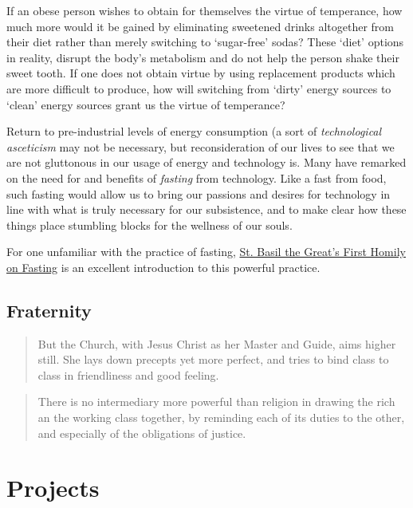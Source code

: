 \documentclass[letterpaper]{article}
\begin{document}
If an obese person wishes to obtain for themselves the virtue of temperance, how much more would it be gained by eliminating sweetened drinks altogether from their diet rather than merely switching to `sugar-free' sodas? These `diet' options in reality, disrupt the body's metabolism and do not help the person shake their sweet tooth. If one does not obtain virtue by using replacement products which are more difficult to produce, how will switching from `dirty' energy sources to `clean' energy sources grant us the virtue of temperance?

Return to pre-industrial levels of energy consumption (a sort of \textit{technological asceticism} may not be necessary, but reconsideration of our lives to see that we are not gluttonous in our usage of energy and technology is. Many have remarked on the need for and benefits of \textit{fasting} from technology. Like a fast from food, such fasting would allow us to bring our passions and desires for technology in line with what is truly necessary for our subsistence, and to make clear how these things place stumbling blocks for the wellness of our souls. 

For one unfamiliar with the practice of fasting, \href{http://rutgersnb.occministries.org/wp-content/uploads/2015/07/St.-Basil-the-Great%E2%80%99s-First-Homily-on-Fasting.pdf}{St. Basil the Great's First Homily on Fasting} is an excellent introduction to this powerful practice. 

\subsection{Fraternity}

\begin{quote}
  But the Church, with Jesus Christ as her Master and Guide, aims higher still. She lays down precepts yet more perfect, and tries to bind class to class in friendliness and good feeling.
\end{quote}

\begin{quote}
  There is no intermediary more powerful than religion in drawing the rich an the working class together, by reminding each of its duties to the other, and especially of the obligations of justice.
\end{quote}

\section{Projects}
\end{document}
